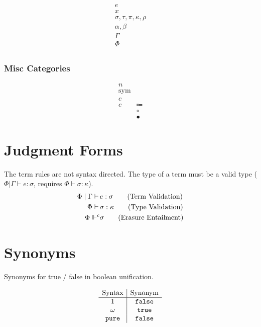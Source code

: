 \documentclass {article}
\begin{document}
\begin{align*}
e \tag{Terms} \\
x \tag{Variables} \\
\sigma, \tau, \pi, \kappa, \rho \tag{Types} \\
\alpha, \beta \tag{Type Variables} \\
\Gamma \tag{Type Environment} \\
\Phi \tag{Misc Environment} \\
\end{align*}

\subsubsection{Misc Categories}
\begin{align*}
n \tag{Numbers} \\
\text{sym} \tag{Symbol} \\
c \tag{Erasure} \\
c & \Coloneqq \\
& \circ \tag{Transparent} \\
& \bullet \tag{Concrete}
\end{align*}

\section{Judgment Forms}
The term rules are not syntax directed.
The type of a term must be a valid type ($ \Phi | \Gamma \vdash e : \sigma $, requires $ \Phi \vdash \sigma : \kappa $).
\begin{align*}
\Phi \mid \Gamma \vdash \, & e : \sigma \tag{\text{Term Validation}} \\
\Phi \vdash \, & \sigma : \kappa \tag{\text{Type Validation}} \\
\Phi \Vdash^c & \sigma \tag{Erasure Entailment}
\end{align*}

\section{Synonyms}

Synonyms for true / false in boolean unification.

\begin{gather*}
\begin{array}{c | c}
\text{Syntax} & \text{Synonym} \\
\hline
1 & \texttt{false} \\
\omega & \texttt{true} \\
\texttt{pure} & \texttt{false} \\
\end{array}
\end{gather*} 
\end{document}
